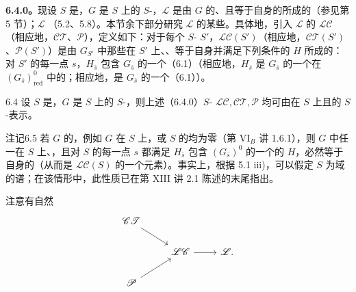 \textbf{6.4.0。}现设 $S$ 是，$G$ 是 $S$ 上的 $S$-，$\mathscr L$ 是由 $G$ 的、且等于自身的所成的（参见第 5 节）；$\mathscr L$ （5.2、5.8）。本节余下部分研究 $\mathscr L$ 的某些。具体地，引入 $\mathscr L$ 的 $\mathscr L\mathscr C$（相应地，$\mathscr C\mathscr T$、$\mathscr P$），定义如下：对于每个 $S$- $S'$，$\mathscr L\mathscr C(S')$（相应地，$\mathscr C\mathscr T(S')$、$\mathscr P(S')$）是由 $G_{S'}$ 中那些在 $S'$ 上、、等于自身并满足下列条件的 $H$ 所成的：对 $S'$ 的每一点 $s$，$H_{\bar s}$ 包含 $G_{\bar s}$ 的一个（6.1）（相应地，$H_{\bar s}$ 是 $G_{\bar s}$ 的一个在 $(G_{\bar s})_{\mathrm{red}}^0$ 中的；相应地，是 $G_{\bar s}$ 的一个（6.1））。
\begin{SGAresult}{}{6.4}
设 $S$ 是，$G$ 是 $S$ 上的 $S$-，则上述（6.4.0）$S$- $\mathscr L\mathscr C,\mathscr C\mathscr T,\mathscr P$ 均可由在 $S$ 上且的 $S$-表示。
\end{SGAresult}
\begin{SGAresult}{注记}{6.5}
若 $G$ 的，例如 $G$ 在 $S$ 上，或 $S$ 的均为零（第 VI$_B$ 讲 1.6.1），则 $G$ 中任一在 $S$ 上、，且对 $S$ 的每一点 $s$ 都满足 $H_{\bar s}$ 包含 $(G_{\bar s})^0$ 的一个的 $H$，必然等于自身的（从而是 $\mathscr L\mathscr C(S)$ 的一个元素）。事实上，根据 5.1 iii)，可以假定 $S$ 为域的谱；在该情形中，此性质已在第 XIII 讲 2.1 陈述的末尾指出。
\end{SGAresult}
注意有自然
\[
\begin{tikzcd}
\mathscr C\mathscr T\arrow[dr]&&\\
&\mathscr L\mathscr C\arrow[r]&\mathscr L.\\
\mathscr P\arrow[ur]&&
\end{tikzcd}
\]
